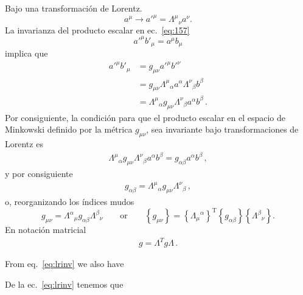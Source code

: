 \begin{frame}
Bajo una transformaci\'on de Lorentz.
\begin{equation}
  a^\mu\to {a'}^\mu={\Lambda^\mu}_{\nu}a^\nu.
\end{equation}
La invarianza del producto escalar en ec.~\eqref{eq:157}
\begin{equation}
  {a'}^\mu{b'}_\mu=a^\mu b_\mu
\end{equation}
implica que
\begin{align}
\label{eq:Lambdasteps}
  {a'}^\mu{b'}_\mu&=g_{\mu\nu}{a'}^\mu{b'}^{\nu}\nonumber\\
  &=g_{\mu\nu}{\Lambda^{\mu}}_{\alpha}a^{\alpha}{\Lambda^{\nu}}_{\beta}b^{\beta}\nonumber\\
 &={\Lambda^{\mu}}_{\alpha}g_{\mu\nu}{\Lambda^{\nu}}_{\beta}a^{\alpha}b^{\beta}\,.
\end{align}
Por consiguiente, la condición para que el producto escalar  en el espacio de Minkowski definido por la métrica $g_{\mu\nu}$, sea invariante bajo transformaciones de Lorentz es
\begin{align}
  {\Lambda^{\mu}}_{\alpha}g_{\mu\nu}{\Lambda^{\nu}}_{\beta}a^{\alpha}b^{\beta}=
  g_{\alpha\beta}a^{\alpha}b^{\beta}\,,
\end{align}
y por consiguiente
\begin{align}
  g_{\alpha\beta}={\Lambda^{\mu}}_{\alpha}g_{\mu\nu}{\Lambda^{\nu}}_{\beta}\,,
\end{align}
o, reorganizando los índices mudos
\begin{equation}
  \label{eq:lrinv}
  g_{\mu\nu}={\Lambda^\alpha}_{\mu}g_{\alpha\beta}{\Lambda^\beta}_{\nu}\qquad\text{or}\qquad 
\left\{g_{\mu\nu}\right\}=\left\{{\Lambda_{\mu}}^{\alpha}\right\}^{\text{T}}\left\{g_{\alpha\beta}\right\}\left\{{\Lambda^\beta}_{\nu}\right\}.
\end{equation}
En notaci\'on matricial
\begin{align}
 g=\Lambda^T g \Lambda\,. 
\end{align}

\begin{english}
From eq.~\eqref{eq:lrinv} we also have  
\end{english}
\begin{spanish}
De la ec.~\eqref{eq:lrinv} tenemos que
\end{spanish}


\end{frame}

